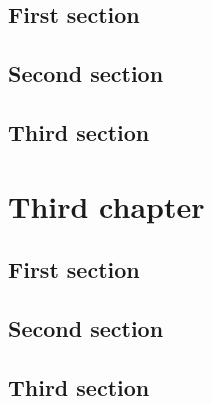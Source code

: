 \documentclass{tstextbook}
\begin{document}
\begin{summary}
  \blindtext
\end{summary}

\section{First section}
\Blindtext

\section{Second section}
\Blindtext

\section{Third section}
\Blindtext

\chapter{Third chapter}

\begin{summary}
  \blindtext
\end{summary}

\section{First section}
\Blindtext

\section{Second section}
\Blindtext

\section{Third section}
\Blindtext


\printbibliography{}


\printindex
\end{document}
